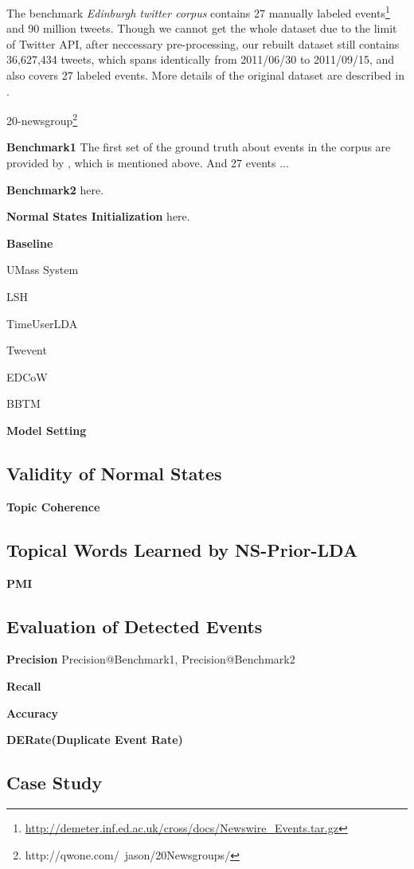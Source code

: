 \documentclass[conference,compsoc]{IEEEtran}
\begin{document}
The benchmark \textit{Edinburgh twitter corpus} contains 27 manually labeled events\cite{petrovic2013can}\footnote{\url{http://demeter.inf.ed.ac.uk/cross/docs/Newswire_Events.tar.gz}} and 90 million tweets. Though we cannot get the whole dataset due to the limit of Twitter API, after neccessary pre-processing, our rebuilt dataset still contains 36,627,434 tweets, which spans identically from 2011/06/30 to 2011/09/15, and also covers 27 labeled events.
More details of the original dataset are described in \cite{petrovic2010edinburgh}.

20-newsgroup\footnote{http://qwone.com/~jason/20Newsgroups/}

\textbf{Benchmark1} The first set of the ground truth about events in the corpus are provided by \cite{petrovic2013can}, which is mentioned above. 
And 27 events ...

\textbf{Benchmark2} here.

\textbf{Normal States Initialization} here.

\textbf{Baseline}

UMass System

LSH

TimeUserLDA

Twevent

EDCoW

BBTM

\textbf{Model Setting}

\subsection{Validity of Normal States}
\textbf{Topic Coherence} \cite{roder2015exploring}
\subsection{Topical Words Learned by NS-Prior-LDA}
\textbf{PMI}
\subsection{Evaluation of Detected Events}
\textbf{Precision} Precision@Benchmark1, Precision@Benchmark2

\textbf{Recall}

\textbf{Accuracy}

\textbf{DERate(Duplicate Event Rate)}
\subsection{Case Study}
\end{document}
